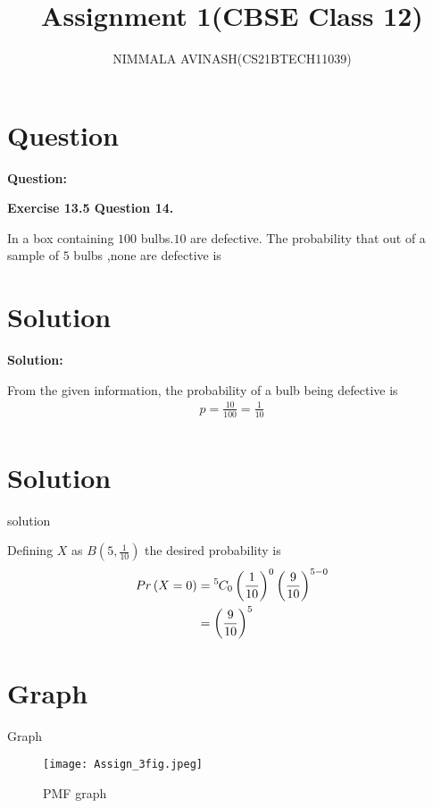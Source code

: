 \documentclass{beamer}
\title{Assignment 1(CBSE Class 12)}
\author{NIMMALA AVINASH(CS21BTECH11039)}
\providecommand{\brak}[1]{\ensuremath{\left(#1\right)}}
\newcommand*{\permcomb}[4][0mu]{{{}^{#3}\mkern#1#2_{#4}}}
\newcommand*{\comb}[1][-1mu]{\permcomb[#1]{C}}
\begin{document}
\begin{frame}
 \titlepage
\end{frame}
\section{Question}
\begin{frame}
{\Large \textbf{Question:}\\}

{\Large \textbf{Exercise 13.5 Question 14.}}

\begin{Large}

In a box containing $100$ bulbs.$10$ are defective. The probability that out of a sample of $5$ bulbs ,none are defective is \\

\end{Large}

\end{frame}

\section{Solution}
\begin{frame}
{\Large \textbf{Solution:}\\}
\begin{Large}
From the given information, the probability of a bulb being defective is
\begin{align}
p = \frac{10}{100} = \frac{1}{10}\\
\end{align}
\end{Large}
\end{frame}
\section{Solution}
\begin{frame}{solution}
\begin{Large}
Defining $X$ as $B \brak{5,\frac{1}{10}}$  the desired probability is\\
\begin{align}
    Pr\brak{X=0} &= \comb{5}{0} \brak{\frac{1}{10}}^{0} \brak{\frac{9}{10}} ^ {5-0}\\
    &= \brak{\frac{9}{10}}^5
\end{align}
\end{Large}
\end{frame}
\section{Graph}
\begin{frame}{Graph}
\begin{figure}
    \centering
    \texttt{[image: Assign\_3fig.jpeg]}
    \caption{PMF graph}
    \label{fig 1}
\end{figure}
\end{frame}
\end{document}
